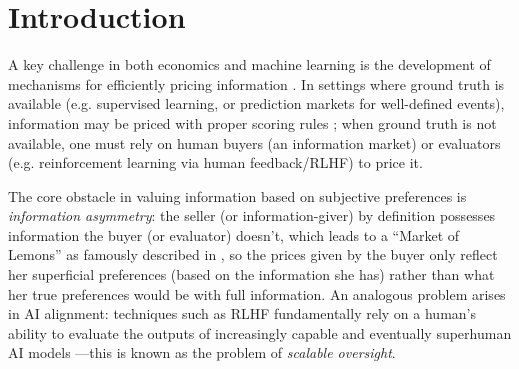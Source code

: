 \section{Introduction}



A key challenge in both economics and machine learning is the development of mechanisms for efficiently pricing information . In settings where ground truth is available (e.g. supervised learning, or prediction markets for well-defined events), information may be priced with proper scoring rules \citep{hansonLogarithmicMarketScoring2002}; when ground truth is not available, one must rely on human buyers (an information market) or evaluators (e.g. reinforcement learning via human feedback/RLHF) to price it.

The core obstacle in valuing information based on subjective preferences is \emph{information asymmetry}: the seller (or information-giver) by definition possesses information the buyer (or evaluator) doesn't, which leads to a ``Market of Lemons'' as famously described in , so the prices given by the buyer only reflect her superficial preferences (based on the information she has) rather than what her true preferences would be with full information. An analogous problem arises in AI alignment: techniques such as RLHF fundamentally rely on a human's ability to evaluate the outputs of increasingly capable and eventually superhuman AI models ---this is known as the problem of \emph{scalable oversight}.






